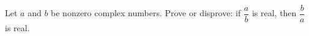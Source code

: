 Let $a$ and $b$ be nonzero complex numbers. Prove or disprove: if $\dfrac {a}{b}$ is real, then $\dfrac {b}{a}$ is real.
